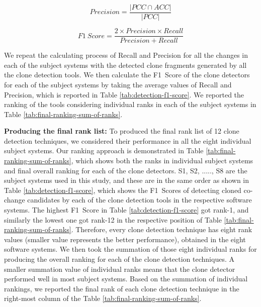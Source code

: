 \documentclass[review]{elsarticle}
\begin{document}
\begin{equation}
    Precision = \frac{|PCC \cap ACC|}{|PCC|}
\end{equation}

\begin{equation}
\label{eq-f1-score}
    F1~Score = \frac{2 \times Precision \times Recall}{Precision + Recall}
\end{equation}

\vspace{1mm}
We repeat the calculating process of Recall and Precision for all the changes in each of the subject systems with the detected clone fragments generated by all the clone detection tools. We then calculate the F1~Score of the clone detectors for each of the subject systems by taking the average values of Recall and Precision, which is reported in Table \ref{tab:detection-f1-score}. We reported the ranking of the tools considering individual ranks in each of the subject systems in Table \ref{tab:final-ranking-sum-of-ranks}.

\textbf{Producing the final rank list:} To produced the final rank list of 12 clone detection techniques, we considered their performance in all the eight individual subject systems. Our ranking approach is demonstrated in Table \ref{tab:final-ranking-sum-of-ranks}, which shows both the ranks in individual subject systems and final overall ranking for each of the clone detectors. S1, S2, ....., S8 are the subject systems used in this study, and these are in the same order as shown in Table \ref{tab:detection-f1-score}, which shows the F1~Scores of detecting cloned co-change candidates by each of the clone detection tools in the respective software systems. The highest F1~Score in Table \ref{tab:detection-f1-score} got rank-1, and similarly the lowest one got rank-12 in the respective position of Table \ref{tab:final-ranking-sum-of-ranks}. Therefore, every clone detection technique has eight rank values (smaller value represents the better performance), obtained in the eight software systems. We then took the summation of those eight individual ranks for producing the overall ranking for each of the clone detection techniques. A smaller summation value of individual ranks means that the clone detector performed well in most subject systems. Based on the summation of individual rankings, we reported the final rank of each clone detection technique in the right-most column of the Table \ref{tab:final-ranking-sum-of-ranks}. 
\end{document}
